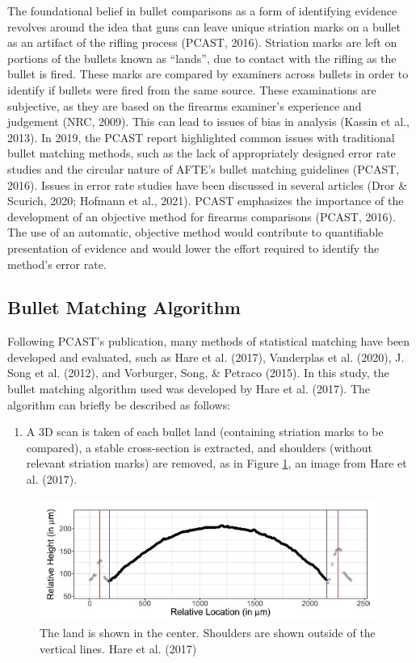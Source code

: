 \documentclass[print]{nuthesis}
\providecommand{\tightlist}{%
  \setlength{\itemsep}{0pt}\setlength{\parskip}{0pt}}
\begin{document}
The foundational belief in bullet comparisons as a form of identifying evidence revolves around the idea that guns can leave unique striation marks on a bullet as an artifact of the rifling process (PCAST, 2016).
Striation marks are left on portions of the bullets known as ``lands'', due to contact with the rifling as the bullet is fired.
These marks are compared by examiners across bullets in order to identify if bullets were fired from the same source.
These examinations are subjective, as they are based on the firearms examiner's experience and judgement (NRC, 2009).
This can lead to issues of bias in analysis (Kassin et al., 2013). In 2019, the PCAST report highlighted common issues with traditional bullet matching methods, such as the lack of appropriately designed error rate studies and the circular nature of AFTE's bullet matching guidelines (PCAST, 2016).
Issues in error rate studies have been discussed in several articles (Dror \& Scurich, 2020; Hofmann et al., 2021).
PCAST emphasizes the importance of the development of an objective method for firearms comparisons (PCAST, 2016).
The use of an automatic, objective method would contribute to quantifiable presentation of evidence and would lower the effort required to identify the method's error rate.

\hypertarget{bullet-matching-algorithm-1}{%
\subsection{Bullet Matching Algorithm}\label{bullet-matching-algorithm-1}}

Following PCAST's publication, many methods of statistical matching have been developed and evaluated, such as Hare et al. (2017), Vanderplas et al. (2020), J. Song et al. (2012), and Vorburger, Song, \& Petraco (2015).
In this study, the bullet matching algorithm used was developed by Hare et al. (2017).
The algorithm can briefly be described as follows:

\begin{enumerate}
\def\labelenumi{\arabic{enumi}.}
\tightlist
\item
  A 3D scan is taken of each bullet land (containing striation marks to be compared), a stable cross-section is extracted, and shoulders (without relevant striation marks) are removed, as in Figure \ref{fig:shoulder}, an image from Hare et al. (2017).
\end{enumerate}

\begin{figure}
\includegraphics[width=\linewidth]{images/shoulder} \caption{The land is shown in the center. Shoulders are shown outside of the vertical lines. Hare et al. (2017)}\label{fig:shoulder}
\end{figure}
\end{document}
